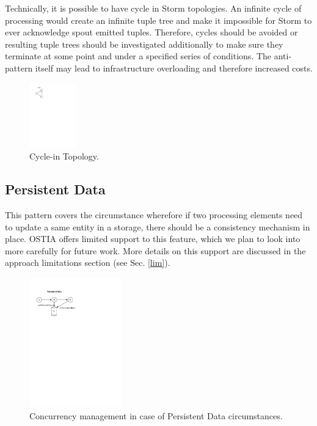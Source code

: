 Technically, it is possible to have cycle in Storm topologies. An infinite cycle of processing would create an infinite tuple tree and make it impossible for Storm to ever acknowledge spout emitted tuples. Therefore, cycles should be avoided or resulting tuple trees should be investigated additionally to make sure they terminate at some point and under a specified series of conditions. The anti-pattern itself may lead to infrastructure overloading and therefore increased costs.

\begin{figure}[H]
	\begin{center}
		\includegraphics[width=2cm]{images/cycle}
		\caption{Cycle-in Topology.}
		\label{fig:cycle}
	\end{center}
\end{figure}

\subsection{Persistent Data}

This pattern covers the circumstance wherefore if two processing elements need to update a same entity in a storage, there should be a consistency mechanism in place. OSTIA offers limited support to this feature, which we plan to look into more carefully for future work. More details on this support are discussed in the approach limitations section (see Sec. \ref{lim}).

\begin{figure}[H]
	\begin{center}
		\includegraphics[width=4cm]{images/persistence}
		\caption{Concurrency management in case of Persistent Data circumstances.}
		\label{fig:persistence}
	\end{center}
\end{figure}


